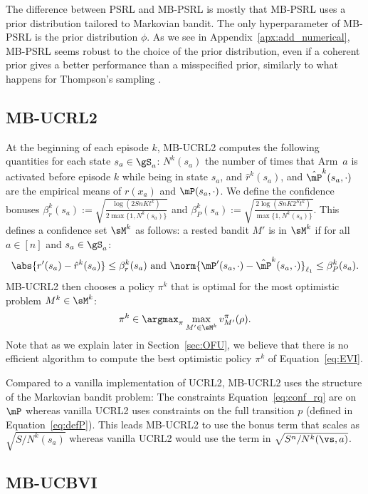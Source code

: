 The difference between PSRL and MB-PSRL is mostly that MB-PSRL uses a prior distribution tailored to Markovian bandit.  The only hyperparameter of MB-PSRL is the prior distribution $\phi$. As we see in Appendix~\ref{apx:add_numerical},
MB-PSRL seems robust to the choice of the prior distribution, even if a
coherent prior gives a better performance than a misspecified prior, similarly
to what happens for Thompson's sampling \cite{russo2018tutorial}. 

\subsection{MB-UCRL2}
At the beginning of each episode $k$, MB-UCRL2 computes the following quantities for each state $s_a\in\gS_a$: $N^{k}(s_a)$ the number of times that Arm~$a$ is activated before episode $k$ while being in state $s_a$, and $\hat{r}^{k}(s_a)$, and $\hat{\mP}^{k}(s_a,\cdot)$ are the empirical means of $r(x_a)$ and $\mP(s_a,\cdot)$. We define the confidence bonuses
$\beta_r^{k}(s_a):=\sqrt{\frac{\log(2SnKt^{k})}{2\max\{1,N^{k}(s_a)\}}}$
and
$\beta_P^{k}(s_a):=\sqrt{\frac{2\log(SnK2^St^k)}{\max\{1,N^{k}(s_a)\}}}$.
This defines a confidence set $\sM^k$  as follows: a rested bandit $M'$
is in $\sM^k$ if for all $a\in[n]$ and $s_a\in\gS_a$: 
\begin{align}
    \label{eq:conf_rq}
    \abs{r'(s_a) - \hat{r}^{k}(s_a)} \le \beta_r^{k}(s_a) \text{ and }
    \norm{{\mP'}(s_a,\cdot) - \hat{\mP}^{k}(s_a,\cdot)}_{\ell_1} \le \beta_P^{k}(s_a).            
\end{align}
MB-UCRL2 then chooses a policy $\pi^k$ that is optimal for the most optimistic problem $M^k\in\sM^k$:
\begin{align}
    \pi^k \in \argmax_{\pi} \max_{M'\in\sM^k}v^{\pi}_{M'}(\rho).
    \label{eq:EVI}
\end{align}
Note that as we explain later in Section~\ref{sec:OFU}, we believe that there is no  efficient algorithm to compute the best optimistic policy $\pi^k$ of Equation~\eqref{eq:EVI}.

Compared to a vanilla implementation of UCRL2, MB-UCRL2 uses the structure of the Markovian bandit problem: The constraints Equation~\eqref{eq:conf_rq} are on $\mP$ whereas vanilla UCRL2 uses constraints on the full transition $p$ (defined in Equation~\eqref{eq:defP}). This leads MB-UCRL2 to use the bonus term that scales as $\sqrt{S/N^{k}(s_a)}$ whereas vanilla UCRL2 would use the term in $\sqrt{S^n/N^{k}(\vs, a)}$.

\subsection{MB-UCBVI}

